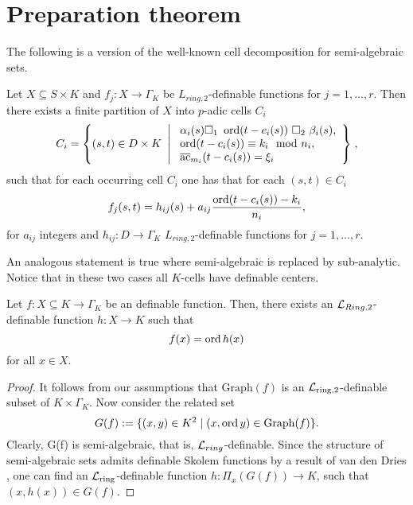 \section{Preparation theorem}

The following is a version of the well-known cell decomposition for semi-algebraic sets. 

\begin{prop}\label{prop.celldecomp}
Let $X \subseteq  S \times K$ and $f_j:X \to\Gamma_K $ be $L_{ring,2}$-definable functions for $j=1,\ldots,r$. Then there exists a finite partition of $X$ into $p$-adic cells $C_i$ 
\[C_i = \left\{(s,t) \in D\times K \ \left| \ \begin{array}{l} \alpha_i(s) \square_1 \ \ord(t-c_i(s)) \ \square_2 \ \beta_i(s),\\ \ord(t-c_i(s)) \equiv k_i\mod n_i,\\ \ac_{m_i}(t-c_i(s)) = \xi_i \end{array} \right\}\right.,\]
such that for each occurring cell $C_i$ one has that for each $(s,t)\in C_i$
\[f_j(s,t)=  h_{ij}(s)+ a_{ij}\frac{\operatorname{ord}(t- c_i(s))- k_i}{n_i},
\]
for $a_{ij}$ integers and $h_{ij}: D\to \Gamma_K$ $L_{ring,2}$-definable functions for $j=1,\ldots,r$. 
\end{prop}

An analogous statement is true where semi-algebraic is replaced by sub-analytic. Notice that in these two cases all $K$-cells have definable centers. 

\begin{lem}\label{lem.semialgfnc}
Let $f: X \subseteq K \to \Gamma_K$ be an definable function. Then, there exists an ${\mathcal L}_{Ring,2}$-definable function {$h: X\to K$} such that \[f(x) = \operatorname{ord} h(x)\] for all $x \in X$. 
\end{lem}
\begin{proof}

It follows from our assumptions that $\mathrm{Graph}(f)$ is an $\mathcal{L}_{\text{ring}, 2}$-definable subset of $K \times \Gamma_K$. Now consider the related set
\[ G(f) := \{(x,y) \in K^2 \mid (x, \operatorname{ord} y) \in \mathrm{Graph}(f)\}.\]
Clearly, G(f) is semi-algebraic, that is, ${\mathcal L}_{ring}$-definable. Since the structure of semi-algebraic sets admits definable Skolem functions by a result of van den Dries \cite{vdd-84}, one can find an $\mathcal{L}_{\text{ring}}$-definable function $h: \Pi_x(G(f)) \to K$, such that $(x, h(x)) \in G(f)$. 
\end{proof}

